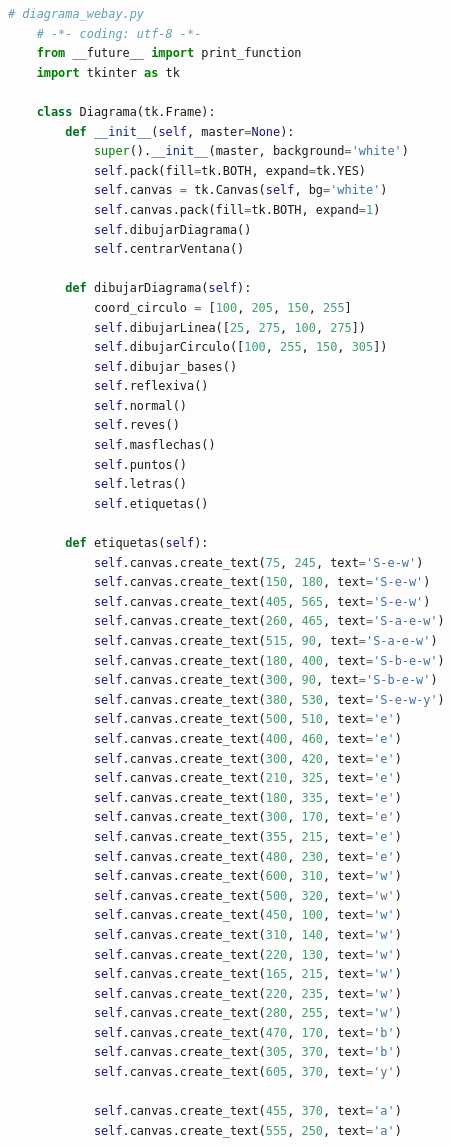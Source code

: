 	\begin{lstlisting}[language=Python]
	# diagrama_webay.py
	# -*- coding: utf-8 -*-
	from __future__ import print_function
	import tkinter as tk

	class Diagrama(tk.Frame):
	    def __init__(self, master=None):
	        super().__init__(master, background='white')
	        self.pack(fill=tk.BOTH, expand=tk.YES)
	        self.canvas = tk.Canvas(self, bg='white')
	        self.canvas.pack(fill=tk.BOTH, expand=1)
	        self.dibujarDiagrama()
	        self.centrarVentana()

	    def dibujarDiagrama(self):
	        coord_circulo = [100, 205, 150, 255]
	        self.dibujarLinea([25, 275, 100, 275])
	        self.dibujarCirculo([100, 255, 150, 305])
	        self.dibujar_bases()
	        self.reflexiva()
	        self.normal()
	        self.reves()
	        self.masflechas()
	        self.puntos()
	        self.letras()
	        self.etiquetas()

	    def etiquetas(self):
	        self.canvas.create_text(75, 245, text='S-e-w')
	        self.canvas.create_text(150, 180, text='S-e-w')
	        self.canvas.create_text(405, 565, text='S-e-w')
	        self.canvas.create_text(260, 465, text='S-a-e-w')
	        self.canvas.create_text(515, 90, text='S-a-e-w')
	        self.canvas.create_text(180, 400, text='S-b-e-w')
	        self.canvas.create_text(300, 90, text='S-b-e-w')
	        self.canvas.create_text(380, 530, text='S-e-w-y')
	        self.canvas.create_text(500, 510, text='e')
	        self.canvas.create_text(400, 460, text='e')
	        self.canvas.create_text(300, 420, text='e')
	        self.canvas.create_text(210, 325, text='e')
	        self.canvas.create_text(180, 335, text='e')
	        self.canvas.create_text(300, 170, text='e')
	        self.canvas.create_text(355, 215, text='e')
	        self.canvas.create_text(480, 230, text='e')
	        self.canvas.create_text(600, 310, text='w')
	        self.canvas.create_text(500, 320, text='w')
	        self.canvas.create_text(450, 100, text='w')
	        self.canvas.create_text(310, 140, text='w')
	        self.canvas.create_text(220, 130, text='w')
	        self.canvas.create_text(165, 215, text='w')
	        self.canvas.create_text(220, 235, text='w')
	        self.canvas.create_text(280, 255, text='w')
	        self.canvas.create_text(470, 170, text='b')
	        self.canvas.create_text(305, 370, text='b')
	        self.canvas.create_text(605, 370, text='y')

	        self.canvas.create_text(455, 370, text='a')
	        self.canvas.create_text(555, 250, text='a')


\end{lstlisting}
